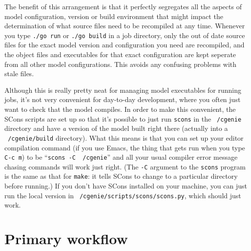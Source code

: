 \documentclass[a4paper,10pt,article]{memoir}
\begin{document}
The benefit of this arrangement is that it perfectly segregates all
the aspects of model configuration, version or build environment that
might impact the determination of what source files need to be
recompiled at any time.  Whenever you type \texttt{./go run} or
\texttt{./go build} in a job directory, only the out of date source
files for the exact model version and configuration you need are
recompiled, and the object files and executables for that exact
configuration are kept seperate from all other model configurations.
This avoids any confusing problems with stale files.

Although this is really pretty neat for managing model executables for
running jobs, it's not very convenient for day-to-day development,
where you often just want to check that the model compiles.  In order
to make this convenient, the SCons scripts are set up so that it's
possible to just run \texttt{scons} in the \texttt{~/cgenie} directory
and have \emph{a} version of the model built right there (actually
into a \texttt{~/cgenie/build} directory).  What this means is that
you can set up your editor compilation command (if you use Emacs, the
thing that gets run when you type \texttt{C-c m}) to be
``\texttt{scons -C ~/cgenie}'' and all your usual compiler error
message chasing commands will work just right.  (The \texttt{-C}
argument to the \texttt{scons} program is the same as that for
\texttt{make}: it tells SCons to change to a particular directory
before running.)  If you don't have SCons installed on your machine,
you can just run the local version in
\texttt{~/cgenie/scripts/scons/scons.py}, which should just work.

\section{Primary workflow}
\end{document}
